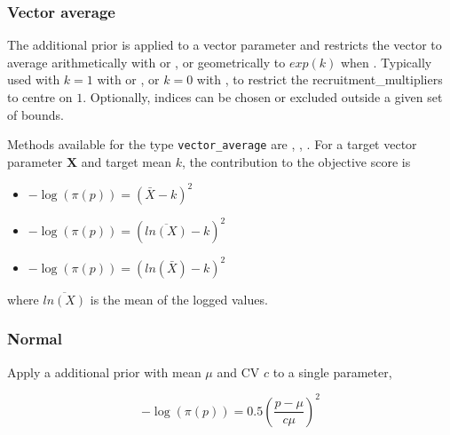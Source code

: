 \subsubsection{Vector average}\label{sec:AdditionalPrior-VectorAverage}

The  additional prior is applied to a vector parameter and restricts the vector to average arithmetically with  or , or geometrically to $exp(k)$ when . Typically used with $k=1$ with  or , or $k=0$ with , to restrict the recruitment\_multipliers to centre on $1$. Optionally, indices can be chosen or excluded outside a given set of bounds.

Methods available for the type \texttt{vector\_average} are , , . For a target vector parameter $\textbf{X}$ and target mean $k$, the contribution to the objective score is
	
\begin{itemize}
	\item {}
	
	$- \log \left(\pi \left(p \right) \right) = \left(\bar{X} - k\right)^2$
	
	\item {}
	
	$- \log \left(\pi \left(p \right) \right) = \left(\overline{ln\left(X\right)} - k\right)^2$
	
	\item {}
	
	$- \log \left(\pi \left(p \right) \right) = \left(ln\left(\bar{X}\right) - k\right)^2$
\end{itemize}

where $\overline{ln\left(X\right)}$ is the mean of the logged values.

\subsubsection{Normal}\label{sec:AdditionalPrior-Normal}

Apply a  additional prior with mean $\mu$ and CV $c$ to a single parameter,

\begin{equation}
- \log \left(\pi \left(p \right) \right) = 0.5\left(\frac{p - \mu}{c\mu} \right)^2
\end{equation}

